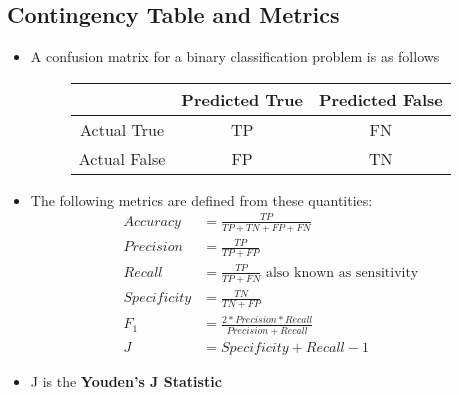 \documentclass{article}
\theoremstyle{plain}
\theoremstyle{definition}
\begin{document}
\subsection{Contingency Table and Metrics}
\begin{itemize}
    \item A confusion matrix for a binary classification problem is as follows
    
    \begin{figure}[!ht]
    \centering
    \begin{tabular}{|c|c|c|}
        \hline
        & Predicted True & Predicted False \\
        \hline
        Actual True &  TP & FN \\
        \hline
        Actual False & FP & TN \\
        \hline
    \end{tabular}
    \end{figure}
    
    \item The following metrics are defined from these quantities:
    \begin{align*}
        Accuracy &= \frac{TP}{TP+TN+FP+FN}\\
        Precision &= \frac{TP}{TP+FP}\\
        Recall &= \frac{TP}{TP+FN} \text{ also known as sensitivity}\\
        Specificity &= \frac{TN}{TN+FP}\\
        F_1 &= \frac{2*Precision*Recall}{Precision + Recall}\\
        J &= Specificity + Recall - 1
    \end{align*}
    
    \item J is the \textbf{Youden's J Statistic}
\end{itemize}
\end{document}
